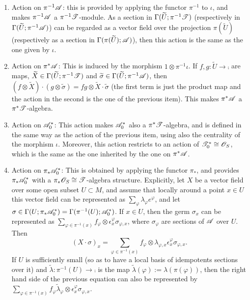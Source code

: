 \begin{enumerate}

\item Action on $\pi^{-1}\mathscr{A}$: this is provided by applying the functor $\pi^{-1}$ to $\iota$, and makes $\pi^{-1}\mathscr{A}$ a $\pi^{-1}\mathscr{T}$-module. As a section in $\Gamma (\widetilde{U};\pi^{-1}\mathscr{T})$ (respectively in $\Gamma (\widetilde{U};\pi^{-1}\mathscr{A})$) can be regarded as a vector field over the projection $\pi (\widetilde{U})$ (respectively as a section in $\Gamma (\pi (\widetilde{U});\mathscr{A})$), then this action is the same as the one given by $\iota$.

\item Action on $\pi^*\mathscr{A}$: This is induced by the morphism $1\otimes \pi^{-1}\iota$. If $f,g:\widetilde{U}\to \comp$ are maps, $\widetilde{X}\in \Gamma (\widetilde{U};\pi^{-1}\mathscr{T})$ and $\widetilde{\sigma}\in \Gamma (\widetilde{U};\pi^{-1}\mathscr{A})$, then $(f\otimes \widetilde{X})\cdot (g\otimes \widetilde{\sigma})=fg\otimes \widetilde{X}\cdot \widetilde{\sigma}$ (the first term is just the product map and the action in the second is the one of the previous item). This makes $\pi^*\mathscr{A}$ a $\pi^*\mathscr{T}$-algebra.

\item Action on $\mathscr{A}^*_0$: This action makes $\mathscr{A}^*_0$ also a $\pi^*\mathscr{T}$-algebra, and is defined in the same way as the action of the previous item, using also the centrality of the morphism $\iota$. Moreover, this action restricts to an action of $\mathscr{T}^*_0\cong \mathscr{O}_S$, which is the same as the one inherited by the one on $\pi^*\mathscr{A}$.

\item Action on $\pi_*\mathscr{A}^*_0$: This is obtained by applying the functor $\pi_*$, and provides $\pi_*\mathscr{A}^*_0$ with a $\pi_*\mathscr{O}_S\cong \mathscr{T}$-algebra structure. Explicitly, let $X$ be a vector field over some open subset $U\subset M$, and assume that locally around a point $x\in U$ this vector field can be represented as $\sum_\varphi \lambda_\varphi e^{\varphi}$, and let $\sigma \in \Gamma (U;\pi_*\mathscr{A}^*_0)=\Gamma (\pi^{-1}(U);\mathscr{A}^*_0)$. If $x\in U$, then the germ $\sigma_x$ can be represented as $\sum_{\varphi \in \pi^{-1}(x)}f_{\varphi}\otimes \epsilon^{\varphi}_x\sigma_{\varphi ,x}$, where $\sigma_{\varphi}$ are sections of $\mathscr{A}$ over $U$. Then
$$(X\cdot \sigma)_x=\sum_{\varphi \in \pi^{-1}(x)}f_\varphi\otimes \lambda_{\varphi ,x}\epsilon^{\varphi}_x\sigma_{\varphi ,x}.$$
If $U$ is sufficiently small (so as to have a local basis of idempotents sections over it) and $\widetilde{\lambda} :\pi^{-1}(U)\to \comp$ is the map $\widetilde{\lambda}(\varphi ):=\lambda (\pi (\varphi ))$, then the right hand side of the previous equation can also be represented by $\sum_{\varphi \in \pi^{-1}(x)} f_\varphi \widetilde{\lambda}_\varphi \otimes \epsilon^{\varphi}_x\sigma_{\varphi ,x}$.

\end{enumerate}

